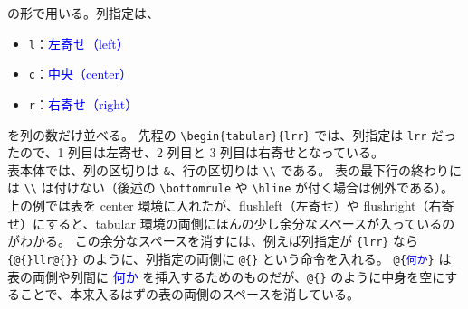の形で用いる。列指定は、
\begin{itemize}\setlength{\leftskip}{-1.00zw}%
\item \texttt{l}：\textcolor{blue}{左寄せ（left）}
\item \texttt{c}：\textcolor{blue}{中央（center）}
\item \texttt{r}：\textcolor{blue}{右寄せ（right）}
\end{itemize}
を列の数だけ並べる。
先程の \verb`\begin{tabular}{lrr}` では、列指定は \texttt{lrr} だったので、1 列目は左寄せ、2 列目と 3 列目は右寄せとなっている。\\

表本体では、列の区切りは \verb`&`、行の区切りは \verb`\\` である。
表の最下行の終わりには \verb`\\` は付けない（後述の \verb`\bottomrule` や \verb`\hline` が付く場合は例外である）。\\

上の例では表を center 環境に入れたが、flushleft（左寄せ）や flushright（右寄せ）にすると、tabular 環境の両側にほんの少し余分なスペースが入っているのがわかる。
この余分なスペースを消すには、例えば列指定が \texttt{\{lrr\}} なら \texttt{\{@\{\}llr@\{\}\}} のように、列指定の両側に \texttt{@\{\}} という命令を入れる。
\texttt{@\{\textcolor{blue}{何か}\}} は表の両側や列間に \textcolor{blue}{何か} を挿入するためのものだが、\texttt{@\{\}} のように中身を空にすることで、本来入るはずの表の両側のスペースを消している。
